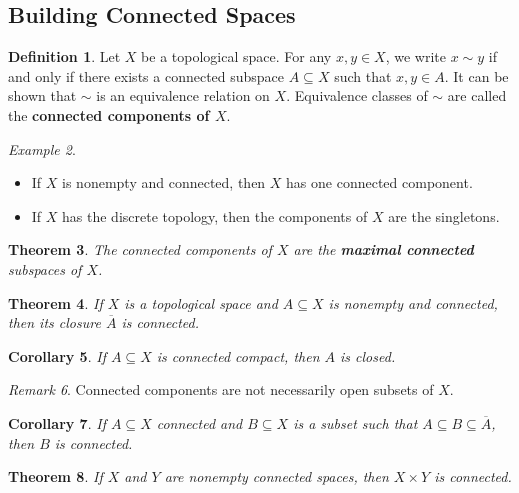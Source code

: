\documentclass[ 12pt ]{article}
\newcounter{lecture_num}
\theoremstyle{plain}
\theoremstyle{plain}
\newtheorem{theorem}{Theorem}[lecture_num]
\newtheorem{corollary}[theorem]{Corollary}
\theoremstyle{definition}
\newtheorem{definition}[theorem]{Definition}
\theoremstyle{remark}
\newtheorem{remark}[theorem]{Remark}
\newtheorem{example}[theorem]{Example}
\begin{document}
\subsection*{Building Connected Spaces}

\begin{definition}
	Let $X$ be a topological space. For any $x, y \in X$, we write $x \sim y$ if and only if there exists a connected subspace $A \subseteq X$ such that $x, y \in A$. It can be shown that $\sim$ is an equivalence relation on $X$. Equivalence classes of $\sim$ are called the \textbf{connected components of $X$}.
\end{definition}

\begin{example} $ $
	\begin{itemize}
		\item If $X$ is nonempty and connected, then $X$ has one connected component.
		\item If $X$ has the discrete topology, then the components of $X$ are the singletons.
	\end{itemize}
\end{example}

\begin{theorem}
	The connected components of $X$ are the \textbf{maximal connected} subspaces of $X$.
\end{theorem}

\begin{theorem}
	If $X$ is a topological space and $A \subseteq X$ is nonempty and connected, then its closure $\overline{A}$ is connected.
\end{theorem}

\begin{corollary}
	If $A \subseteq X$ is connected compact, then $A$ is closed.
\end{corollary}

\begin{remark}
	Connected components are not necessarily open subsets of $X$.
\end{remark}

\begin{corollary}
	If $A \subseteq X$ connected and $B \subseteq X$ is a subset such that $A \subseteq B \subseteq \overline{A}$, then $B$ is connected.
\end{corollary}

\begin{theorem}
	If $X$ and $Y$ are nonempty connected spaces, then $X \times Y$ is connected.
\end{theorem}
\end{document}
